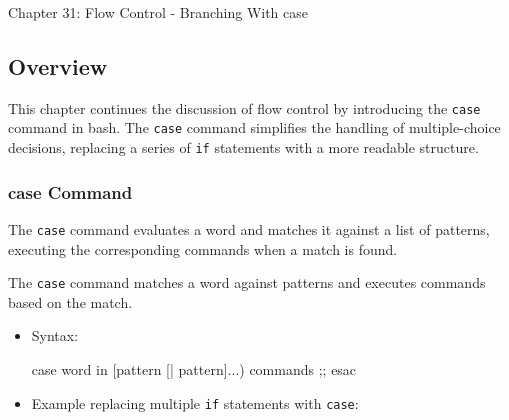 \begin{notes}{Chapter 31: Flow Control - Branching With case}
    \subsection*{Overview}

    This chapter continues the discussion of flow control by introducing the \texttt{case} command in bash. The \texttt{case} command simplifies the handling of multiple-choice decisions, replacing 
    a series of \texttt{if} statements with a more readable structure.
    
    \subsubsection*{case Command}
    
    The \texttt{case} command evaluates a word and matches it against a list of patterns, executing the corresponding commands when a match is found.
    
    \begin{highlight}
    
        The \texttt{case} command matches a word against patterns and executes commands based on the match.
        
        \begin{itemize}
            \item Syntax:
        \begin{code}[Bash]
        case word in
            [pattern [| pattern]...) commands ;;
        esac
        \end{code}
            \item Example replacing multiple \texttt{if} statements with \texttt{case}:
        \end{itemize}
    

\end{highlight}
\end{notes}
